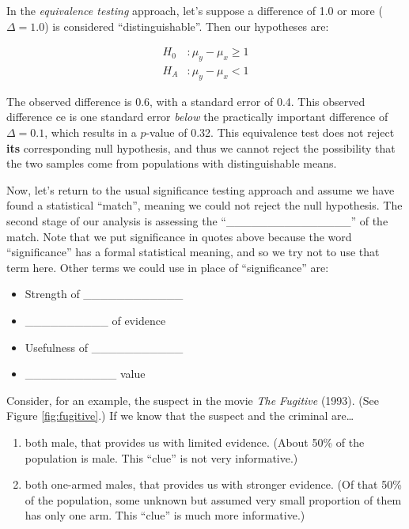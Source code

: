 \documentclass[]{book}
\providecommand{\tightlist}{%
  \setlength{\itemsep}{0pt}\setlength{\parskip}{0pt}}
\theoremstyle{definition}
\theoremstyle{definition}
\theoremstyle{remark}
\begin{document}
In the \emph{equivalence testing} approach, let's suppose a difference
of 1.0 or more (\(\Delta = 1.0\)) is considered ``distinguishable''.
Then our hypotheses are:

\begin{equation}\label{eq:eth1}
\begin{split}
H_0 & : \mu_y - \mu_x \geq 1 \\
H_A & : \mu_y - \mu_x < 1 
\end{split}
\end{equation}

The observed difference is 0.6, with a standard error of 0.4. This
observed difference ce is one standard error \emph{below} the
practically important difference of \(\Delta = 0.1\), which results in a
\(p\)-value of 0.32. This equivalence test does not reject \textbf{its}
corresponding null hypothesis, and thus we cannot reject the possibility
that the two samples come from populations with distinguishable means.

Now, let's return to the usual significance testing approach and assume
we have found a statistical ``match'', meaning we could not reject the
null hypothesis. The second stage of our analysis is assessing the
``\_\_\_\_\_\_\_\_\_\_\_\_\_\_\_'' of the match. Note that we put
significance in quotes above because the word ``significance'' has a
formal statistical meaning, and so we try not to use that term here.
Other terms we could use in place of ``significance'' are:

\begin{itemize}
\tightlist
\item
  Strength of \_\_\_\_\_\_\_\_\_\_\_\_ \vspace{.1in}
\item
  \_\_\_\_\_\_\_\_\_\_ of evidence \vspace{.1in}
\item
  Usefulness of \_\_\_\_\_\_\_\_\_\_\_ \vspace{.1in}
\item
  \_\_\_\_\_\_\_\_\_\_\_ value
\end{itemize}

Consider, for an example, the suspect in the movie \emph{The Fugitive}
(1993). (See Figure \ref{fig:fugitive}.) If we know that the suspect and
the criminal are\ldots{}

\begin{enumerate}
\def\labelenumi{\arabic{enumi}.}
\tightlist
\item
  both male, that provides us with limited evidence. (About 50\% of the
  population is male. This ``clue'' is not very informative.)
\item
  both one-armed males, that provides us with stronger evidence. (Of
  that 50\% of the population, some unknown but assumed very small
  proportion of them has only one arm. This ``clue'' is much more
  informative.)
\end{enumerate}
\end{document}
